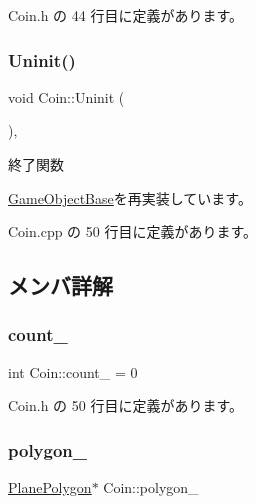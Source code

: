  Coin.\+h の 44 行目に定義があります。

\mbox{\label{class_coin_a4d364dcb4b57b80ea00ce931d0bb300f}} 
\subsubsection{\texorpdfstring{Uninit()}{Uninit()}}
{\footnotesize\ttfamily void Coin\+::\+Uninit (\begin{DoxyParamCaption}{ }\end{DoxyParamCaption})\hspace{0.3cm}{\ttfamily [override]}, {\ttfamily [virtual]}}



終了関数 



\mbox{\hyperlink{class_game_object_base_a97e1bc277d7b1c0156d4735de29a022c}{Game\+Object\+Base}}を再実装しています。



 Coin.\+cpp の 50 行目に定義があります。



\subsection{メンバ詳解}
\mbox{\label{class_coin_aae793812faef50ec76f8293676150a9a}} 
\subsubsection{\texorpdfstring{count\+\_\+}{count\_}}
{\footnotesize\ttfamily int Coin\+::count\+\_\+ = 0\hspace{0.3cm}{\ttfamily [private]}}



 Coin.\+h の 50 行目に定義があります。

\mbox{\label{class_coin_a30f920359d7dd4fa7b44f5135890c377}} 
\subsubsection{\texorpdfstring{polygon\+\_\+}{polygon\_}}
{\footnotesize\ttfamily \mbox{\hyperlink{class_plane_polygon}{Plane\+Polygon}}$\ast$ Coin\+::polygon\+\_\+\hspace{0.3cm}{\ttfamily [private]}}



